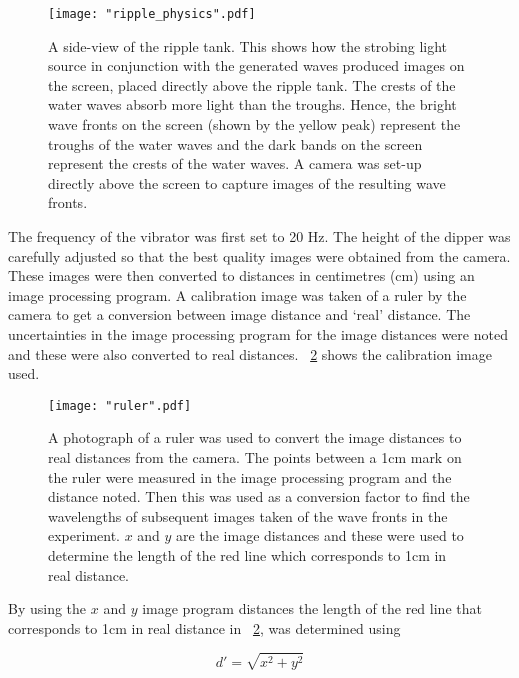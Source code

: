 \documentclass{article}
\newcommand{\figref}[2][\figurename~]{#1\ref{#2}}
\begin{document}
\begin{figure}[h]
\centering
\texttt{[image: "ripple\_physics".pdf]}
\caption{A side-view of the ripple tank. This shows how the strobing light source in conjunction with the generated waves produced images on the screen, placed directly above the ripple tank. The crests of the water waves absorb more light than the troughs. Hence, the bright wave fronts on the screen (shown by the yellow peak) represent the troughs of the water waves and the dark bands on the screen represent the crests of the water waves. A camera was  set-up directly above the screen to capture images of the resulting wave fronts.}
\label{fig:ripple_setup}
\end{figure}

\vspace{2mm}
\noindent
The frequency of the vibrator was first set to 20 Hz. The height of the dipper was carefully adjusted so that the best quality images were obtained from the camera. These images were then converted to distances in centimetres (cm) using an image processing program. A calibration image was taken of a ruler by the camera to get a conversion between image distance and `real' distance. The uncertainties in the image processing program for the image distances were noted and these were also converted to real distances. \figref{fig:ruler} shows the calibration image used. 

\begin{figure}[h]
\centering
\texttt{[image: "ruler".pdf]}
\caption{A photograph of a ruler was used to convert the image distances to real distances from the camera. The points between a 1cm mark on the ruler were measured in the image processing program and the distance noted. Then this was used as a conversion factor to find the wavelengths of subsequent images taken of the wave fronts in the experiment. $x$ and $y$ are the image distances and these were used to determine the length of the red line which corresponds to 1cm in real distance.}
\label{fig:ruler}
\end{figure}

\newpage
\vspace{2mm}
\noindent
By using the $x$ and $y$ image program distances the length of the red line that corresponds to 1cm in real distance in \figref{fig:ruler}, was determined using 

\vspace{2mm}
\noindent
\begin{equation}
\label{eq:pythagoras}
d' = \sqrt{x^2 + y^2}
\end{equation}
\end{document}
